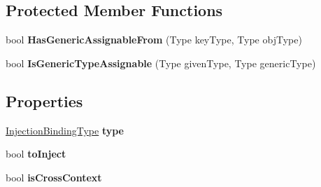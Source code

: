 \subsection*{Protected Member Functions}
\begin{DoxyCompactItemize}
\item 
\hypertarget{classstrange_1_1extensions_1_1injector_1_1impl_1_1_injection_binding_af6cf708f4406b68e831a9d0fa2aa4473}{bool {\bfseries Has\-Generic\-Assignable\-From} (Type key\-Type, Type obj\-Type)}\label{classstrange_1_1extensions_1_1injector_1_1impl_1_1_injection_binding_af6cf708f4406b68e831a9d0fa2aa4473}

\item 
\hypertarget{classstrange_1_1extensions_1_1injector_1_1impl_1_1_injection_binding_a3635e435c73df8ce9d205fda265265bd}{bool {\bfseries Is\-Generic\-Type\-Assignable} (Type given\-Type, Type generic\-Type)}\label{classstrange_1_1extensions_1_1injector_1_1impl_1_1_injection_binding_a3635e435c73df8ce9d205fda265265bd}

\end{DoxyCompactItemize}
\subsection*{Properties}
\begin{DoxyCompactItemize}
\item 
\hypertarget{classstrange_1_1extensions_1_1injector_1_1impl_1_1_injection_binding_a915f5c97eceb69c2d893e8874cc255d1}{\hyperlink{namespacestrange_1_1extensions_1_1injector_1_1api_aaf5414484d7eccb5c502984bd70549ae}{Injection\-Binding\-Type} {\bfseries type}}\label{classstrange_1_1extensions_1_1injector_1_1impl_1_1_injection_binding_a915f5c97eceb69c2d893e8874cc255d1}

\item 
\hypertarget{classstrange_1_1extensions_1_1injector_1_1impl_1_1_injection_binding_aeb55d17167b209c72042d67dee584070}{bool {\bfseries to\-Inject}}\label{classstrange_1_1extensions_1_1injector_1_1impl_1_1_injection_binding_aeb55d17167b209c72042d67dee584070}

\item 
\hypertarget{classstrange_1_1extensions_1_1injector_1_1impl_1_1_injection_binding_ae1cd10550dbe5a828d1db86c40fb098d}{bool {\bfseries is\-Cross\-Context}}\label{classstrange_1_1extensions_1_1injector_1_1impl_1_1_injection_binding_ae1cd10550dbe5a828d1db86c40fb098d}

\end{DoxyCompactItemize}
